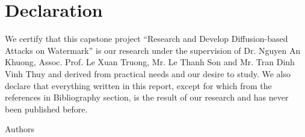 \chapter*{Declaration}
We certify that this capstone project ``Research and Develop Diffusion-based Attacks on Watermark'' is our research under the supervision of Dr. Nguyen An Khuong, Assoc. Prof. Le Xuan Truong, Mr. Le Thanh Son and Mr. Tran Dinh Vinh Thuy and derived from practical needs and our desire to study. We also declare that everything written in this report, except for which from the references in Bibliography section, is the result of our research and has never been published before.

\null\hfill Authors
